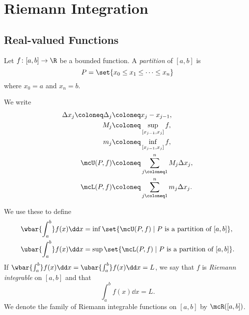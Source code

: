 \chapter{Riemann Integration} \label{chp:riemann}
\section[\R-valued Functions]{Real-valued Functions}
\begin{definition}[Partition] \label{def:partition}
    Let $f\colon [a, b] \to \R$ be a bounded function.
    A \textit{partition} of $[a, b]$ is \[
        P = \set{x_0 \le x_1 \le \cdots \le x_n}
    \] where $x_0 = a$ and $x_n = b$.

    We write \begin{align*}
        \Delta x_j \coloneq \Delta_j &\coloneq x_j - x_{j-1}, \\
        M_j   &\coloneq \sup_{[x_{j-1}, x_j]} f, \\
        m_j   &\coloneq \inf_{[x_{j-1}, x_j]} f, \\
        \mcU(P, f) &\coloneq \sum_{j\coloneq1}^n M_j \Delta x_j, \\
        \mcL(P, f) &\coloneq \sum_{j\coloneq1}^n m_j \Delta x_j.
    \end{align*}
\end{definition}

\begin{definition*} \label{def:riemann}
    We use these to define \begin{align*}
        \wbar{\int_a^b} f(x) \dd x
        &= \inf \set{\mcU(P, f) \mid P \text{ is a partition of } [a, b]}, \\
        \ubar{\int_a^b} f(x) \dd x
        &= \sup \set{\mcL(P, f) \mid P \text{ is a partition of } [a, b]}.
    \end{align*}
    If $\wbar{\int_a^b} f(x) \dd x = \ubar{\int_a^b} f(x) \dd x = L$,
    we say that $f$ is \textit{Riemann integrable} on $[a, b]$ and that \[
        \int_a^b f(x) \dd x = L.
    \] We denote the family of Riemann integrable functions on $[a, b]$ by
    $\mcR([a, b])$.
\end{definition*}

